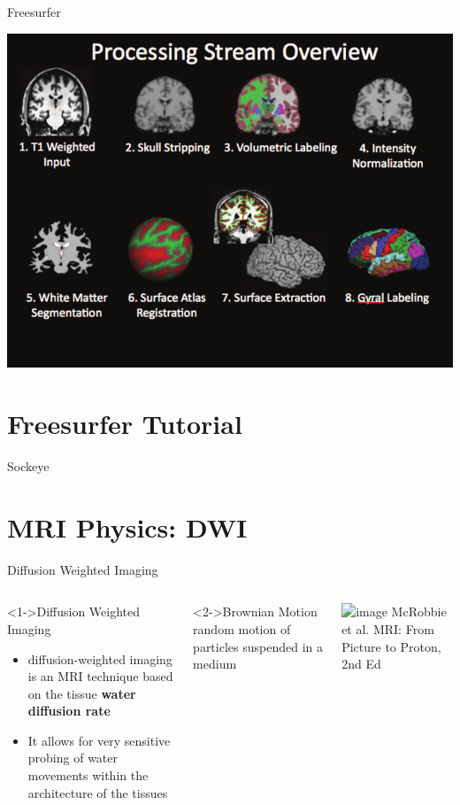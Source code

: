 \documentclass[aspectratio=169,xcolor=dvipsnames]{beamer}
\begin{document}
\begin{frame}{Freesurfer}
\begin{center}
\includegraphics[width=.7\textwidth]{imgs/fspipeline}

\end{center}
\end{frame}

\section{Freesurfer Tutorial}

\begin{frame}{Sockeye}

\end{frame}

\section{MRI Physics: DWI}

\begin{frame}{Diffusion Weighted Imaging}
\begin{columns}
\begin{block}<1->{Diffusion Weighted Imaging}
\begin{itemize}
\item diffusion-weighted imaging is an MRI technique based on the tissue \textbf{water diffusion rate}
\item It allows for very sensitive probing of water movements within the architecture of the tissues
\end{itemize}
\end{block}

\begin{block}<2->{Brownian Motion}
random motion of particles suspended in a medium
\end{block}

\includegraphics<3->[width=1\textwidth]{imgs/diffusion}
\tiny{McRobbie et al. MRI: From Picture to Proton, 2nd Ed}
\end{columns}
\end{frame}
\end{document}
